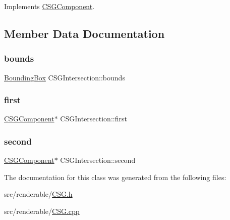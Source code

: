 Implements \mbox{\hyperlink{classCSGComponent_a4299365f2bab69272af9de4f2bee7cdb}{C\+S\+G\+Component}}.



\subsection{Member Data Documentation}
\mbox{\label{classCSGIntersection_a25fb136c5dcda3e15357b6c1abb1c2e2}} 
\subsubsection{\texorpdfstring{bounds}{bounds}}
{\footnotesize\ttfamily \mbox{\hyperlink{classBoundingBox}{Bounding\+Box}} C\+S\+G\+Intersection\+::bounds\hspace{0.3cm}{\ttfamily [private]}}

\mbox{\label{classCSGIntersection_af9619c91599eb3f81342000284e0f1c6}} 
\subsubsection{\texorpdfstring{first}{first}}
{\footnotesize\ttfamily \mbox{\hyperlink{classCSGComponent}{C\+S\+G\+Component}}$\ast$ C\+S\+G\+Intersection\+::first\hspace{0.3cm}{\ttfamily [private]}}

\mbox{\label{classCSGIntersection_a71b90fe1c487c4cc5fce0614f503e29c}} 
\subsubsection{\texorpdfstring{second}{second}}
{\footnotesize\ttfamily \mbox{\hyperlink{classCSGComponent}{C\+S\+G\+Component}}$\ast$ C\+S\+G\+Intersection\+::second\hspace{0.3cm}{\ttfamily [private]}}



The documentation for this class was generated from the following files\+:\begin{DoxyCompactItemize}
\item 
src/renderable/\mbox{\hyperlink{CSG_8h}{C\+S\+G.\+h}}\item 
src/renderable/\mbox{\hyperlink{CSG_8cpp}{C\+S\+G.\+cpp}}\end{DoxyCompactItemize}
